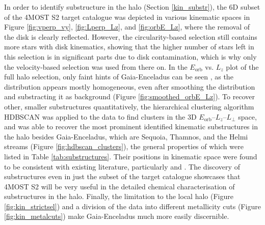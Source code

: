 \documentclass[a4paper,11pt]{article}
\begin{document}
In order to identify substructure in the halo (Section \ref{kin_substr}), the 6D subset of the 4MOST S2 target catalogue was depicted in various kinematic spaces in Figure \ref{fig:vperp_vy}, \ref{fig:Lperp_Lz}, and \ref{fig:orbE_Lz}, where the removal of the disk is clearly reflected. However, the circularity-based selection still contains more stars with disk kinematics, showing that the higher number of stars left in this selection is in significant parts due to disk contamination, which is why only the velocity-based selection was used from there on. In the $E_\mathrm{orb}$ vs. $L_z$ plot of the full halo selection, only faint hints of Gaia-Enceladus can be seen \citep{helmi18,koppelman18}, as the distribution appears mostly homogeneous, even after smoothing the distribution and substracting it as background (Figure \ref{fig:smoothed_orbE_Lz}). To recover other, smaller substructures quantitatively, the hierarchical clustering algorithm \textsc{HDBSCAN} \citep{sklearn} was applied to the data to find clusters in the 3D $E_\mathrm{orb}$--$L_z$--$L_\perp$ space, and was able to recover the most prominent identified kinematic substructures in the halo besides Gaia-Enceladus, which are Sequoia, Thamnos, and the Helmi streams (Figure \ref{fig:hdbscan_clusters}), the general properties of which were listed in Table \ref{tab:substructures}. Their positions in kinematic space were found to be consistent with existing literature, particularly \citet{ruizlara22} and \citet{koppelman19a}. The discovery of substructures even in just the subset of the target catalogue showcases that 4MOST S2 will be very useful in the detailed chemical characterisation of substructures in the halo. Finally, the limitation to the local halo (Figure \ref{fig:kin_strictsel}) and a division of the data into different metallicity cuts (Figure \ref{fig:kin_metalcuts}) make Gaia-Enceladus much more easily discernible.\\ \\
%
\end{document}
